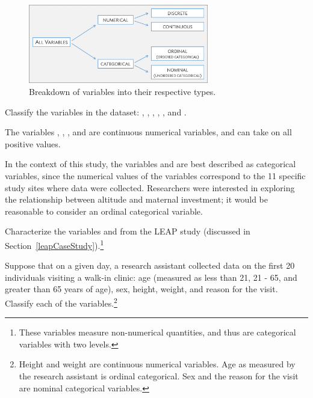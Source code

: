 \begin{figure}
\centering
\includegraphics[width=0.70\textwidth]{ch_intro_to_data_oi_biostat/figures/variables/variableTypes.png}
\caption{Breakdown of variables into their respective types.}
\label{variableTypesFig}
\end{figure}

\begin{example}{Classify the variables in the  dataset: , , , , , and .}

The variables , , , and  are continuous numerical variables, and can take on all positive values.

In the context of this study, the variables  and  are best described as categorical variables, since the numerical values of the variables correspond to the 11 specific study sites where data were collected. Researchers were interested in exploring the relationship between altitude and maternal investment; it would be reasonable to consider  an ordinal categorical variable.
	
\end{example}

\begin{exercise} 
	Characterize the variables  and  from the LEAP study (discussed in Section~\ref{leapCaseStudy}).\footnote{These variables measure non-numerical quantities, and thus are categorical variables with two levels.}
\end{exercise}

\begin{exercise}Suppose that on a given day, a research assistant collected data on the first 20 individuals visiting a walk-in clinic: age (measured as less than 21, 21 - 65, and greater than 65 years of age), sex, height, weight, and reason for the visit.  Classify each of the variables.\footnote{Height and weight are continuous numerical variables. Age as measured by the research assistant is ordinal categorical. Sex and the reason for the visit are nominal categorical variables.} 
\end{exercise}


